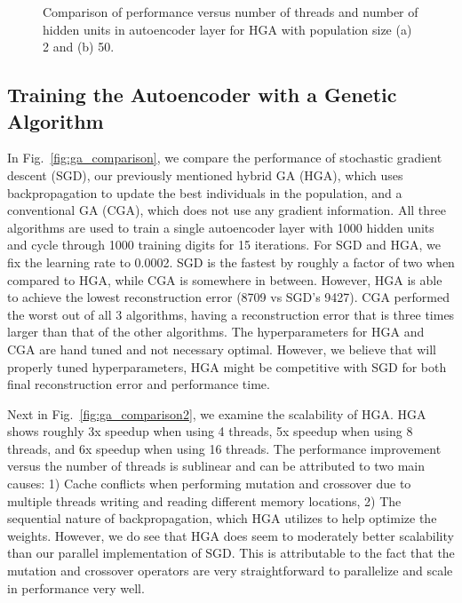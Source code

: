 \begin{figure*}[h]
	\centering
	\caption{Comparison of performance versus number of threads and number of hidden units in autoencoder layer for HGA with population size (a) 2 and (b) 50.}
	\label{fig:ga_comparison3}
\end{figure*}

\subsection{Training the Autoencoder with a Genetic Algorithm}

In Fig.~\ref{fig:ga_comparison}, we compare the performance of stochastic gradient descent (SGD), our previously mentioned hybrid GA (HGA), which uses backpropagation to update the best individuals in the population, and a conventional GA (CGA), which does not use any gradient information. All three algorithms are used to train a single autoencoder layer with 1000 hidden units and cycle through 1000 training digits for 15 iterations. For SGD and HGA, we fix the learning rate to 0.0002. SGD is the fastest by roughly a factor of two when compared to HGA, while CGA is somewhere in between. However, HGA is able to achieve the lowest reconstruction error (8709 vs SGD's 9427). CGA performed the worst out of all 3 algorithms, having a reconstruction error that is three times larger than that of the other algorithms. The hyperparameters for HGA and CGA are hand tuned and not necessary optimal. However, we believe that will properly tuned hyperparameters, HGA might be competitive with SGD for both final reconstruction error and performance time. 

Next in Fig.~\ref{fig:ga_comparison2}, we examine the scalability of HGA. HGA shows roughly 3x speedup when using 4 threads, 5x speedup when using 8 threads, and 6x speedup when using 16 threads. The performance improvement versus the number of threads is sublinear and can be attributed to two main causes: 1) Cache conflicts when performing mutation and crossover due to multiple threads writing and reading different memory locations, 2) The sequential nature of backpropagation, which HGA utilizes to help optimize the weights. However, we do see that HGA does seem to moderately better scalability than our parallel implementation of SGD. This is attributable to the fact that the mutation and crossover operators are very straightforward to parallelize and scale in performance very well. 

